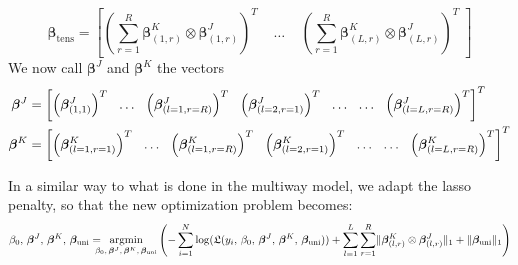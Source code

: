 \documentclass[10pt]{article}
\begin{document}
\begin{equation}
    \bm{\beta}_{\text{tens}} = \left[ \left(\sum\limits_{r = 1}^R \bm{\beta}_{(1,r)}^K \otimes \bm{\beta}_{(1,r)}^J \right)^T \; \; \; \; \hdots \; \; \; \;  \left(\sum\limits_{r = 1}^R \bm{\beta}_{(L,r)}^K \otimes \bm{\beta}_{(L,r)}^J \right)^T \;  \right]
\end{equation}
We now call $\bm{\beta}^J$ and $\bm{\beta}^K$ the vectors
\begin{align}
    \bm{\beta}^J &= \left[ \left(\bm{\beta}_{(1,1)}^J \right)^T \hspace{7 pt} \hdots \hspace{7 pt} \left(\bm{\beta}_{(l = 1,r = R)}^J \right)^T  \hspace{7 pt}  \left(\bm{\beta}_{(l = 2,r = 1)}^J \right)^T  \hspace{7 pt} \hdots \hspace{7 pt}  \hdots \hspace{7 pt}  \left(\bm{\beta}_{(l = L,r = R)}^J \right)^T  \right]^T\\
    \bm{\beta}^K &= \left[ \left(\bm{\beta}_{(l = 1,r = 1)}^K \right)^T \hspace{7 pt} \hdots \hspace{7 pt} \left(\bm{\beta}_{(l = 1,r = R)}^K \right)^T  \hspace{7 pt}  \left(\bm{\beta}_{(l = 2,r = 1)}^K \right)^T  \hspace{7 pt} \hdots \hspace{7 pt}  \hdots \hspace{7 pt}  \left(\bm{\beta}_{(l = L,r = R)}^K \right)^T  \right]^T
\end{align}

\noindent In a similar way to what is done in the multiway model, we adapt the lasso penalty, so that the new optimization problem becomes:
\begin{equation}
    \beta_0 ,\, \bm{\beta}^J, \, \bm{\beta}^K, \, \bm{\beta}_{\text{uni}} = \hspace{- 8 pt} \underset{\beta_0 ,\, \bm{\beta}^J, \, \bm{\beta}^K, \, \bm{\beta}_{\text{uni}}}{\text{argmin}} \left( - \sum\limits_{i = 1}^{N} \log(\mathfrak{L}(y_i, \, \beta_0 ,\, \bm{\beta}^J, \, \bm{\beta}^K, \, \bm{\beta}_{\text{uni}})) + \sum\limits_{l = 1}^L \sum\limits_{r = 1}^R 
    \lVert \bm{\beta}_{(l,r)}^K \otimes \bm{\beta}_{(l,r)}^J \rVert_1 + \lVert \bm{\beta}_{\text{uni}} \rVert_1 \right)
\end{equation}
\end{document}
